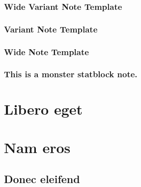 \begin{hbNoteWide2}
\begin{multicols}{2}
\subsubsection*{Wide Variant Note Template}
\noindent\lipsum[11-13]
\end{multicols}
\end{hbNoteWide2}

\lipsum[4-12]


\begin{hbNote2}[b]
\subsubsection*{Variant Note Template}
\noindent\lipsum[106]
\end{hbNote2}

\begin{hbNoteWide}[b]
\begin{multicols}{2}
\subsubsection*{Wide Note Template}
\noindent\lipsum[13-14]
\end{multicols}
\end{hbNoteWide}

 \lipsum[110-111]

\begin{hbMonsterNote}
\subsubsection*{This is a monster statblock note.}
\noindent\lipsum[16]
\end{hbMonsterNote}

\lipsum[112-115]

\section*{Libero eget} \lipsum[116-118]
\section*{Nam eros} \lipsum[119-120]

\subsection*{Donec eleifend} \lipsum[120-121]
